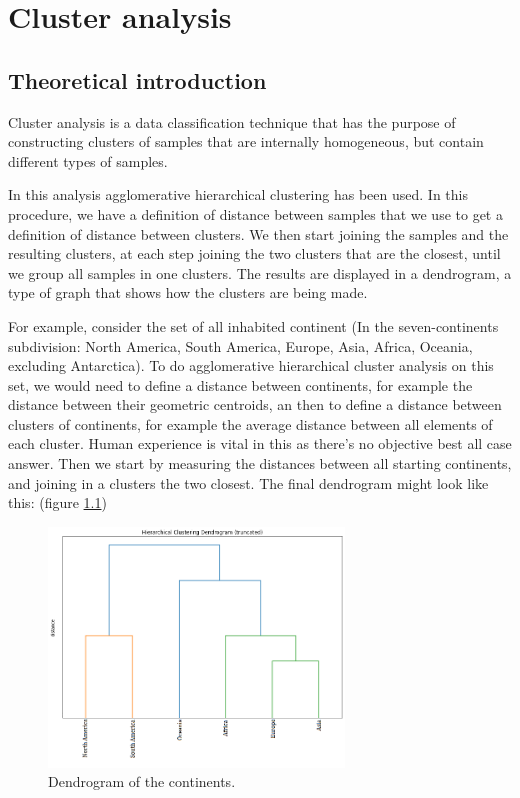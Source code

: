 \documentclass[a4paper]{report}
\begin{document}
\chapter{Cluster analysis}

\section{Theoretical introduction}

Cluster analysis is a data classification technique that has the purpose of constructing clusters of samples that are internally homogeneous, but contain different types of samples.

In this analysis agglomerative hierarchical clustering has been used. In this procedure, we have a definition of distance between samples that we use to get a definition of distance between clusters. We then start joining the samples and the resulting clusters, at each step joining the two clusters that are the closest, until we group all samples in one clusters. The results are displayed in a dendrogram, a type of graph that shows how the clusters are being made.

For example, consider the set of all inhabited continent (In the seven-continents subdivision: North America, South America, Europe, Asia, Africa, Oceania, excluding Antarctica). To do agglomerative hierarchical cluster analysis on this set, we would need to define a distance between continents, for example the distance between their geometric centroids, an then to define a distance between clusters of continents, for example the average distance between all elements of each cluster. Human experience is vital in this as there's no objective best all case answer. Then we start by measuring the distances between all starting continents, and joining in a clusters the two closest. The final dendrogram might look like this: (figure \ref{conte})

\begin{figure} [H]
\centering
\includegraphics [width=0.7\textwidth] {o/continents.png}
\caption{Dendrogram of the continents.}
\label{conte}
\end{figure}
\end{document}
